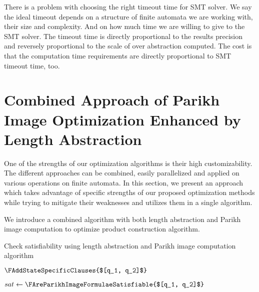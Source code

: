 There is a problem with choosing the right timeout time for SMT solver. We say the ideal timeout depends on a structure of finite automata we are working with, their size and complexity. And on how much time we are willing to give to the SMT solver. The timeout time is directly proportional to the results precision and reversely proportional to the scale of over abstraction computed. The cost is that the computation time requirements are directly proportional to SMT timeout time, too.


\section{Combined Approach of Parikh Image Optimization Enhanced by Length Abstraction}

One of the strengths of our optimization algorithms is their high customizability. The different approaches can be combined, easily parallelized and applied on various operations on finite automata. In this section, we present an approach which takes advantage of specific strengths of our proposed optimization methods while trying to mitigate their weaknesses and utilizes them in a single algorithm.

We introduce a combined algorithm with both length abstraction and Parikh image computation to optimize product construction algorithm. %

\begin{algorithm}
\caption{Check satisfiability using length abstraction and Parikh image computation algorithm}\label{checkSatisfiabilityAlgorithm}
\DontPrintSemicolon
{}
\BlankLine


$ \FAddStateSpecificClauses{$[q_1, q_2]$} $\;

$sat \gets \FAreParikhImageFormulaeSatisfiable{$[q_1, q_2]$} $ \;

\end{algorithm}\DecMargin{1em}

